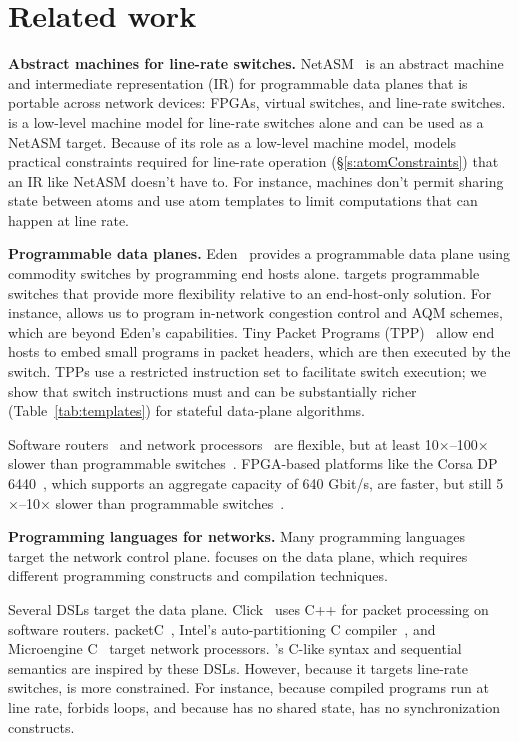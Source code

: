 \section{Related work}
\label{s:related}
\medskip
\noindent
\textbf{Abstract machines for line-rate switches.}
NetASM~\cite{netasm} is an abstract machine and intermediate representation
(IR) for programmable data planes that is portable across network
devices: FPGAs, virtual switches, and line-rate switches.  \absmachine is a
low-level machine model for line-rate switches alone and can be used as a
NetASM target. Because of its role as a low-level machine model, \absmachine
models practical constraints required for line-rate operation (\S\ref{s:atomConstraints}) that an IR like
NetASM doesn't have to. For instance, \absmachine machines don't permit sharing
state between atoms and use atom templates to limit computations that can
happen at line rate.

\medskip
\noindent
\textbf{Programmable data planes.}
Eden~\cite{eden} provides a programmable data plane using commodity switches by
programming end hosts alone. \pktlanguage targets programmable switches that
provide more flexibility relative to an end-host-only solution. For instance,
\pktlanguage allows us to program in-network congestion control and AQM
schemes, which are beyond Eden's capabilities.  Tiny Packet Programs
(TPP)~\cite{tpp} allow end hosts to embed small programs in packet headers,
which are then executed by the switch. TPPs use a restricted instruction set to
facilitate switch execution; we show that switch instructions must and can be
substantially richer (Table~\ref{tab:templates}) for stateful data-plane
algorithms.

Software routers~\cite{click, routebricks} and network processors~\cite{ixp4xx}
are flexible, but at least 10$\times$--100$\times$ slower than programmable
switches~\cite{xpliant, tofino}.  FPGA-based platforms like the Corsa DP
6440~\cite{corsa}, which supports an aggregate capacity of 640 Gbit/s, are
faster, but still 5$\times$--10$\times$ slower than programmable
switches~\cite{xpliant, tofino}.

\medskip
\noindent
\textbf{Programming languages for networks.} Many programming languages~\cite{frenetic, maple} target the network control plane.
\pktlanguage focuses on the data plane, which requires different
programming constructs and compilation techniques.

Several DSLs target the data plane. Click~\cite{click} uses C++ for packet
processing on software routers. packetC~\cite{packetc}, Intel's
auto-partitioning C compiler~\cite{intel_uiuc_pldi}, and Microengine
C~\cite{microenginec} target network processors. \pktlanguage's C-like syntax
and sequential semantics are inspired by these DSLs. However, because it targets
line-rate switches, \pktlanguage is more constrained. For instance, because
compiled programs run at line rate, \pktlanguage forbids loops, and because
\absmachine has no shared state, \pktlanguage has no synchronization constructs.

